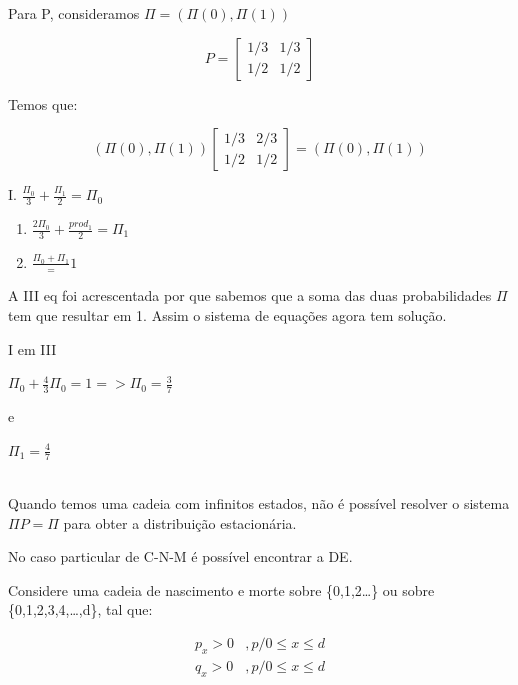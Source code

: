 \documentclass[]{article}
\theoremstyle{definition}
\theoremstyle{definition}
\theoremstyle{definition}
\theoremstyle{remark}
\let\BeginKnitrBlock\begin \let\EndKnitrBlock\end
\begin{document}
\BeginKnitrBlock{example}
\protect\hypertarget{exm:unnamed-chunk-52}{}{\label{exm:unnamed-chunk-52} }

Para P, consideramos \(\Pi = (\Pi(0),\Pi(1))\)

\begin{equation}
P = \begin{bmatrix}
1/3 & 1/3 \\
1/2 & 1/2
\end{bmatrix}
\end{equation}

Temos que:

\begin{equation}
(\Pi(0),\Pi(1)) \begin{bmatrix}
1/3 & 2/3 \\
1/2 & 1/2
\end{bmatrix} = (\Pi(0),\Pi(1))
\end{equation}

I. \(\frac{\Pi_0}{3} + \frac{\Pi_1}{2} = \Pi_0\)

\begin{enumerate}
\def\labelenumi{\Roman{enumi}.}
\setcounter{enumi}{1}
\item
  \(\frac{2\Pi_0}{3} + \frac{prod_1}{2} = \Pi_1\)
\item
  \(\frac{\Pi_0 + \Pi_1} = 1\)
\end{enumerate}

A III eq foi acrescentada por que sabemos que a soma das duas
probabilidades \(\Pi\) tem que resultar em 1. Assim o sistema de
equações agora tem solução.

I em III

\(\Pi_0 + \frac{4}{3} \Pi_0 = 1 => \Pi_0 = \frac{3}{7}\)

e

\(\Pi_1 = \frac{4}{7}\)
\EndKnitrBlock{example}\\
Quando temos uma cadeia com infinitos estados, não é possível resolver o
sistema \(\Pi P = \Pi\) para obter a distribuição estacionária.

No caso particular de C-N-M é possível encontrar a DE.

Considere uma cadeia de nascimento e morte sobre \{0,1,2\ldots{}\} ou
sobre \{0,1,2,3,4,\ldots{},d\}, tal que:

\begin{equation}
\begin{matrix}
p_x > 0 &, p/ 0 \leq x \leq d \\
q_x > 0 &, p/ 0 \leq x \leq d
\end{matrix}
\end{equation}
\end{document}

